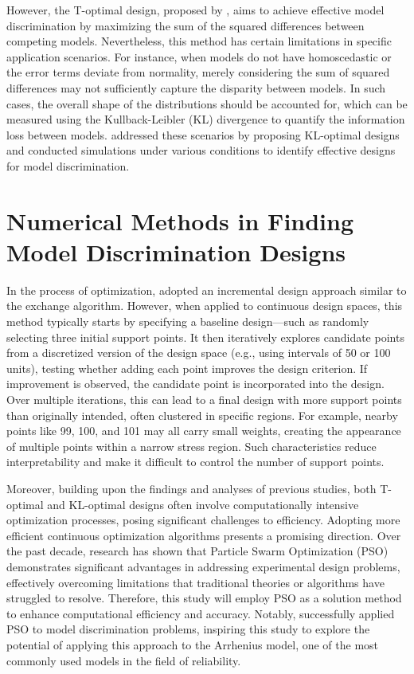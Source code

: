 \hspace*{8mm} However, the T-optimal design, proposed by \cite{atkinson1975design,atkinson1975optimal}, aims to achieve effective model discrimination by maximizing the sum of the squared differences between competing models. Nevertheless, this method has certain limitations in specific application scenarios. For instance, when models do not have homoscedastic or the error terms deviate from normality, merely considering the sum of squared differences may not sufficiently capture the disparity between models. In such cases, the overall shape of the distributions should be accounted for, which can be measured using the Kullback-Leibler (KL) divergence to quantify the information loss between models. \cite{lopez2007optimal} addressed these scenarios by proposing KL-optimal designs and conducted simulations under various conditions to identify effective designs for model discrimination.

\section{Numerical Methods in Finding Model Discrimination Designs}

\hspace*{8mm} In the process of optimization, \cite{atkinson1975design,atkinson1975optimal} adopted an incremental design approach similar to the exchange algorithm. However, when applied to continuous design spaces, this method typically starts by specifying a baseline design—such as randomly selecting three initial support points. It then iteratively explores candidate points from a discretized version of the design space (e.g., using intervals of 50 or 100 units), testing whether adding each point improves the design criterion. If improvement is observed, the candidate point is incorporated into the design. Over multiple iterations, this can lead to a final design with more support points than originally intended, often clustered in specific regions. For example, nearby points like 99, 100, and 101 may all carry small weights, creating the appearance of multiple points within a narrow stress region. Such characteristics reduce interpretability and make it difficult to control the number of support points.

\hspace*{8mm} Moreover, building upon the findings and analyses of previous studies, both T-optimal and KL-optimal designs often involve computationally intensive optimization processes, posing significant challenges to efficiency. Adopting more efficient continuous optimization algorithms presents a promising direction. Over the past decade, research has shown that Particle Swarm Optimization (PSO) demonstrates significant advantages in addressing experimental design problems, effectively overcoming limitations that traditional theories or algorithms have struggled to resolve. Therefore, this study will employ PSO as a solution method to enhance computational efficiency and accuracy. Notably, \cite{chen2020hybrid} successfully applied PSO to model discrimination problems, inspiring this study to explore the potential of applying this approach to the Arrhenius model, one of the most commonly used models in the field of reliability.

